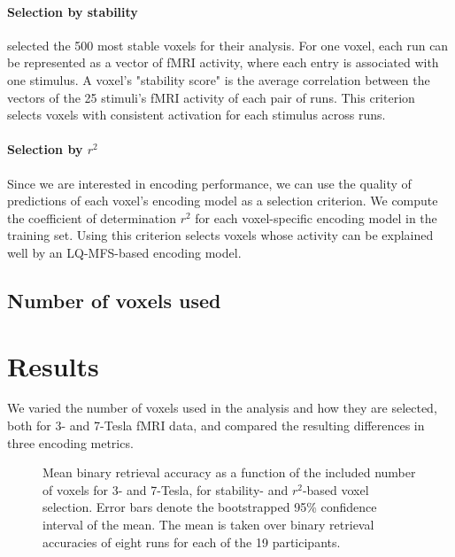 \paragraph{Selection by stability}

\citet{ML08} selected the 500 most stable voxels for their analysis. For one
voxel, each run can be represented as a vector of f{MRI} activity, where each
entry is associated with one stimulus. A voxel's "stability score" is the average correlation between the vectors of the 25 stimuli's f{MRI} activity of each pair of runs.
This criterion selects voxels with consistent activation for each stimulus across runs.

\paragraph{Selection by $r^2$}

Since we are interested in encoding performance, we can use the quality of
predictions of each voxel's encoding model as a selection criterion. We compute
the coefficient of determination $r^2$ for each voxel-specific encoding model in
the training set. Using this criterion selects voxels whose activity can be explained well
by an LQ-MFS-based encoding model.

\subsection*{Number of voxels used}



\section*{Results}
%
We varied the number of voxels used in the analysis and how they are selected,
both for 3- and 7-Tesla f{MRI} data, and compared the resulting differences in
three encoding metrics.

\begin{figure}
  \centering
  \def\svgwidth{\linewidth}
  
	
  \caption{Mean binary retrieval accuracy as a function of the included number of
  voxels for 3- and 7-Tesla, for stability- and $r^2$-based voxel selection. Error bars denote the bootstrapped 95\% confidence
  interval of the mean. The mean is taken over binary retrieval accuracies of
  eight runs for each of the 19 participants.}

 \label{fig:binary_retrieval}
\end{figure}

